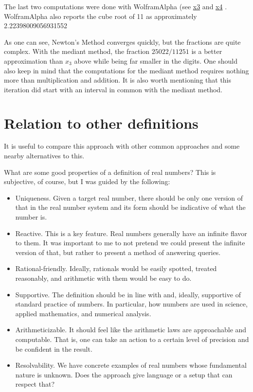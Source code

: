 \documentclass[12pt]{article}
\theoremstyle{remark}
\begin{document}
The last two computations  were done with WolframAlpha (see 
\href{https://www.wolframalpha.com/input?key=&i2d=true&i=%5C%2840%29Divide%5B2162%2C972%5D%5C%2841%29+-+Divide%5B%5C%2840%29+Power%5B%5C%2840%29Divide%5B2162%2C972%5D%5C%2841%29%2C3%5D-+11%5C%2841%29%2C3*Power%5B%5C%2840%29Divide%5B2162%2C972%5D%5C%2841%29%2C2%5D%5D}{x3} and 
\href{https://www.wolframalpha.com/input?key=&i2d=true&i=%5C%2840%29Divide%5B1894566349%2C851880969%5D%5C%2841%29+-++Divide%5B%5C%2840%29+Power%5B%5C%2840%29Divide%5B1894566349%2C851880969%5D%5C%2841%29%2C3%5D-11%5C%2841%29%2C%5C%2840%293+Power%5B%5C%2840%29Divide%5B1894566349%2C851880969%5D%5C%2841%29%2C2%5D%5C%2841%29%5D}{x4} .  WolframAlpha also reports the cube root of 11 as approximately 2.22398009056931552 

As one can see, Newton's Method converges quickly, but the fractions are quite complex. With the mediant method, the fraction $25022/11251$ is a better approximation than $x_3$ above while being far smaller in the digits. One should also keep in mind that the computations for the mediant method requires nothing more than multiplication and addition. It is also worth mentioning that this iteration did start with an interval in common with the mediant method. 


\section{Relation to other definitions}

It is useful to compare this approach with other common approaches and some nearby alternatives to this. 

What are some good properties of a definition of real numbers? This is subjective, of course, but I was guided by the following: 

\begin{itemize}
    \item Uniqueness. Given a target real number, there should be only one version of that in the real number system and its form should be indicative of what the number is. 
    \item Reactive. This is a key feature. Real numbers generally have an infinite flavor to them. It was important to me to not pretend we could present the infinite version of that, but rather to present a method of answering queries. 
    \item Rational-friendly. Ideally, rationals would be easily spotted, treated reasonably, and arithmetic with them would be easy to do. 
    \item Supportive. The definition should be in line with and, ideally, supportive of standard practice of numbers. In particular, how numbers are used in science, applied mathematics, and numerical analysis. 
    \item Arithmeticizable. It should feel like the arithmetic laws are approachable and computable. That is, one can take an action to a certain level of precision and be confident in the result.
    \item Resolvability. We have concrete examples of real numbers whose fundamental nature is unknown. Does the approach give language or a setup that can respect that? 
\end{itemize}
\end{document}
